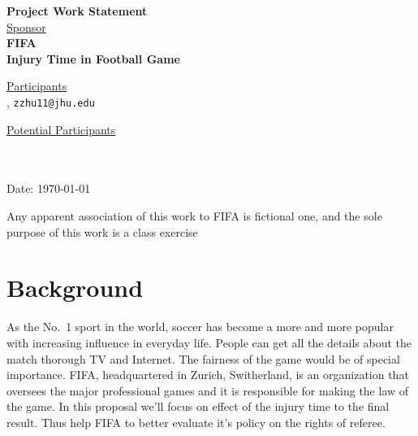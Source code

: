 \documentclass[12pt,letterpaper]{article}
\theoremstyle{definition}
\begin{document}
\def\shiftdowna{0.32in}  %
\def\shiftdownb{0.22in}  %


\begin{center}
\textbf{{\large Project Work Statement}}\\


\vspace \shiftdowna
\underline {Sponsor}\\ 
\vspace{5pt}
\textbf{{\large FIFA}}\\


\vspace \shiftdowna
\textbf{{\large  Injury Time in Football Game}}


\vspace{0.35in}
\vspace \shiftdownb
\underline {Participants} \\
\vspace{5pt}
, \texttt{zzhu11@jhu.edu}

\vspace \shiftdownb
\underline {Potential Participants}\\
\vspace{5pt} \ \\
\vspace{3pt}
\text{}\texttt{} \\
\vspace{3pt}
\text{} \texttt{}

\vspace \shiftdowna
Date: \today

\end{center}

\vfill  
\footnoterule
\noindent \small{Any apparent association of this work to FIFA is
fictional one, and the sole purpose of this work is a class exercise}

\newpage

\section{Background} 
As the No.~1 sport in the world, soccer has become a more and more popular with increasing influence in everyday life. People can get all the details about the match thorough TV and Internet. The fairness of the game would be of special importance. FIFA, headquartered in Zurich, Switherland, is an organization that oversees the major professional games and it is responsible for making the law of the game. In this proposal we'll focus on effect of the injury time to the final result. Thus help FIFA to better evaluate it's policy on the rights of referee. 
\end{document}
